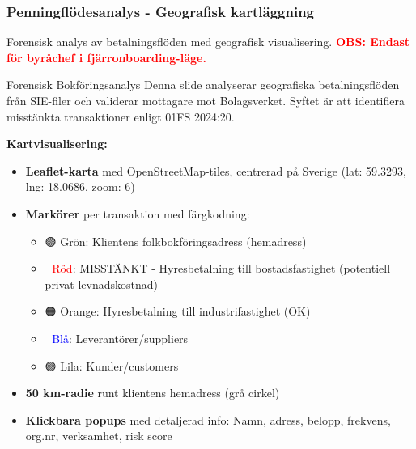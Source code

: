 \documentclass[10pt]{beamer}
\begin{document}
\begin{frame}[label=penningflodes]
  \frametitle{Penningflödesanalys - Geografisk kartläggning}
  \small
  Forensisk analys av betalningsflöden med geografisk visualisering. \textcolor{red}{\textbf{OBS: Endast för byråchef i fjärronboarding-läge.}}
  
  \vspace{0.4cm}
  \begin{alertblock}{Forensisk Bokföringsanalys}
    \footnotesize
    Denna slide analyserar geografiska betalningsflöden från SIE-filer och validerar mottagare mot Bolagsverket.
    Syftet är att identifiera misstänkta transaktioner enligt 01FS 2024:20.
  \end{alertblock}
  
  \vspace{0.4cm}
  \textbf{Kartvisualisering:}\\
  \vspace{0.2cm}
  \footnotesize
  \begin{itemize}
    \item \textbf{Leaflet-karta} med OpenStreetMap-tiles, centrerad på Sverige (lat: 59.3293, lng: 18.0686, zoom: 6)
    \item \textbf{Markörer} per transaktion med färgkodning:
      \begin{itemize}
        \footnotesize
        \item \textcolor{green!70!black}{🟢 Grön}: Klientens folkbokföringsadress (hemadress)
        \item \textcolor{red}{🔴 Röd}: MISSTÄNKT - Hyresbetalning till bostadsfastighet (potentiell privat levnadskostnad)
        \item \textcolor{orange!80!black}{🟠 Orange}: Hyresbetalning till industrifastighet (OK)
        \item \textcolor{blue}{🔵 Blå}: Leverantörer/suppliers
        \item \textcolor{purple!70!black}{🟣 Lila}: Kunder/customers
      \end{itemize}
    \item \textbf{50 km-radie} runt klientens hemadress (grå cirkel)
    \item \textbf{Klickbara popups} med detaljerad info: Namn, adress, belopp, frekvens, org.nr, verksamhet, risk score
  \end{itemize}
  

\end{frame}
\end{document}
